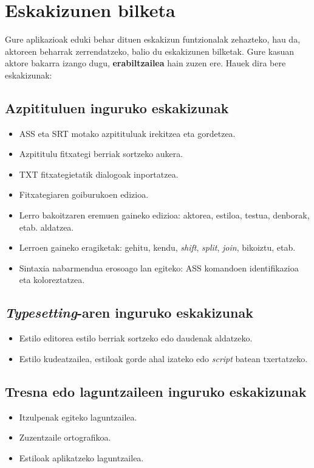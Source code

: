 
\section{Eskakizunen bilketa}
Gure aplikazioak eduki behar dituen eskakizun funtzionalak zehazteko, hau da, aktoreen beharrak zerrendatzeko, balio du eskakizunen bilketak. Gure kasuan aktore bakarra izango dugu, \textbf{erabiltzailea} hain zuzen ere. Hauek dira bere eskakizunak:
\subsection{Azpitituluen inguruko eskakizunak}
\begin{itemize}
\item ASS eta SRT motako azpitituluak irekitzea eta gordetzea.
\item Azpititulu fitxategi berriak sortzeko aukera.
\item TXT fitxategietatik dialogoak inportatzea.
\item Fitxategiaren goiburukoen edizioa.
\item Lerro bakoitzaren eremuen gaineko edizioa: aktorea, estiloa, testua, denborak, etab. aldatzea.
\item Lerroen gaineko eragiketak: gehitu, kendu, \textit{shift}, \textit{split}, \textit{join}, bikoiztu, etab.
\item Sintaxia nabarmendua erosoago lan egiteko: ASS komandoen identifikazioa eta koloreztatzea.
\end{itemize}
\subsection{\textit{Typesetting}-aren inguruko eskakizunak}
\begin{itemize}
\item Estilo editorea estilo berriak sortzeko edo daudenak aldatzeko.
\item Estilo kudeatzailea, estiloak gorde ahal izateko edo \textit{script} batean txertatzeko.
\end{itemize}
\subsection{Tresna edo laguntzaileen inguruko eskakizunak}
\begin{itemize}
\item Itzulpenak egiteko laguntzailea.
\item Zuzentzaile ortografikoa.
\item Estiloak aplikatzeko laguntzailea.
\end{itemize}
